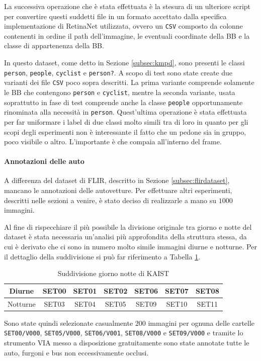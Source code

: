 La successiva operazione che è stata effettuata è la stesura di un ulteriore script per convertire questi suddetti file in un formato accettato dalla specifica implementazione di RetinaNet utilizzata, ovvero un \texttt{CSV} composto da colonne contenenti in ordine il path dell'immagine, le eventuali coordinate della \ac{BB} e la classe di appartenenza della \ac{BB}. 

In questo dataset, come detto in Sezione \ref{subsec:kmpd}, sono presenti le classi \texttt{person}, \texttt{people}, \texttt{cyclist} e \texttt{person?}. A scopo di test sono state create due varianti dei file \texttt{CSV} poco sopra descritti. La prima variante comprende solamente le \ac{BB} che contengono \texttt{person} e \texttt{cyclist}, mentre la seconda variante, usata soprattutto in fase di test comprende anche la classe \texttt{people} opportunamente rinominata alla necessità in \texttt{person}. Quest'ultima operazione è stata effettuata per far uniformare i label di due classi molto simili tra di loro in quanto per gli scopi degli esperimenti non è interessante il fatto che un pedone sia in gruppo, poco visibile o altro. L'importante è che compaia all'interno del frame. 
\paragraph{Annotazioni delle auto}
A differenza del dataset di FLIR, descritto in Sezione \ref{subsec:flirdataset}, mancano le annotazioni delle autovetture. Per effettuare altri esperimenti, descritti nelle sezioni a venire, è stato deciso di realizzarle a mano su $1000$ immagini. 

Al fine di rispecchiare il più possibile la divisione originale tra giorno e notte del dataset è stata necessaria un'analisi più approfondita della struttura stessa, da cui è derivato che ci sono in numero molto simile immagini diurne e notturne. Per il dettaglio della suddivisione si può far riferimento a Tabella \ref{table:day_night_kaist}.
\begin{table}[]
    \begin{tabular}{c|cccccc}
    Diurne & SET00 & SET01 & SET02 & SET06 & SET07 & SET08 \\ \hline
    Notturne & SET03 & SET04 & SET05 & SET09 & SET10 & SET11
    \end{tabular}
    \caption{Suddivisione giorno notte di KAIST}
    \label{table:day_night_kaist}
\end{table}
Sono state quindi selezionate casualmente $200$ immagini per ognuna delle cartelle \texttt{SET00/V000}, \texttt{SET05/V000}, \texttt{SET06/V001}, \texttt{SET08/V000} e \texttt{SET09/V000} e tramite lo strumento \ac{VIA} \cite{dutta2019vgg, dutta2016via} messo a disposizione gratuitamente sono state annotate tutte le auto, furgoni e bus non eccessivamente occlusi. 

